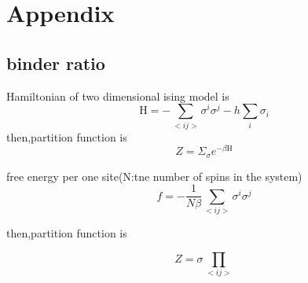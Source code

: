 \appendix
\chapter{Appendix}\label{chap:appendix}

\section{binder ratio}
Hamiltonian of two dimensional ising model is 
\begin{equation}
\mathrm{H}=-\sum_{<ij>}\sigma^{i}\sigma^{j}-h\sum_{i}\sigma_i
\end{equation} 
then,partition function is 
\begin{equation}
Z=\Sigma_{\sigma}e^{-\beta\mathrm{H}}
\end{equation}


free energy per one site(N:tne number of spins in the system)
\begin{equation}
f=-\frac{1}{N\beta}\sum_{<ij>}\sigma^{i}\sigma^{j}
\end{equation} 

then,partition function is 

\begin{equation}
Z=\sigma_{}\prod_{<ij>}
\end{equation}


